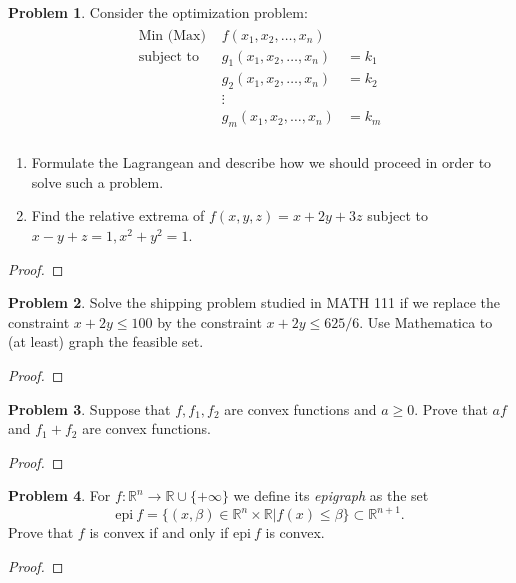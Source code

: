 \documentclass[12pt]{article}
\theoremstyle{definition}
\newtheorem{problem}{Problem}
\begin{document}
\begin{problem}
  Consider the optimization problem:
  \begin{align*}
    \begin{array} {lcl}
      \text{Min (Max) } & f(x_1, x_2, \dots, x_n) & \\
      \text{subject to } & g_1(x_1, x_2, \dots, x_n) &= k_1 \\
      & g_2(x_1, x_2, \dots, x_n) &= k_2 \\
      & \vdots & \\
      & g_m(x_1, x_2, \dots, x_n) &= k_m \\
    \end{array}
  \end{align*}
  \begin{enumerate}
    \item Formulate the Lagrangean and describe how we should proceed in order
      to solve such a problem.
    \item Find the relative extrema of $f(x, y, z) = x + 2y + 3z$ subject to
      $x - y + z = 1, x^2 + y^2 = 1$.
  \end{enumerate}
\end{problem}

\begin{proof}
\end{proof}
\newpage


\begin{problem}
  Solve the shipping problem studied in MATH 111 if we replace the constraint
  $x + 2y \leq 100$ by the constraint $x + 2y \leq 625/6$. Use Mathematica to
  (at least) graph the feasible set.
\end{problem}

\begin{proof}
\end{proof}
\newpage


\begin{problem}
  Suppose that $f, f_1, f_2$ are convex functions and $a \geq 0$. Prove that
  $af$ and $f_1 + f_2$ are convex functions.
\end{problem}

\begin{proof}
\end{proof}
\newpage


\begin{problem}
  For $f: \mathbb{R}^n \to \mathbb{R} \cup \{+\infty\}$ we define its \textit{epigraph}
  as the set
  \[
   \text{epi}\ f = \{(x, \beta) \in \mathbb{R}^n \times \mathbb{R} | f(x) \leq \beta \} \subset \mathbb{R}^{n+1}.
  \]
  Prove that $f$ is convex if and only if $\text{epi}\ f$ is convex.
\end{problem}

\begin{proof}
\end{proof}
\end{document}
